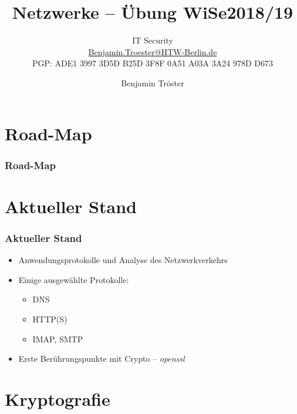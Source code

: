 \documentclass[xcolor=dvipsnames, aspectratio=169]{beamer}
\begin{document}

\title{Netzwerke -- Übung WiSe2018/19}
\subtitle{IT Security\\
		\href{mailto:Benjamin.Troester@HTW-Berlin.de}{Benjamin.Troester@HTW-Berlin.de}\\
		PGP: ADE1 3997 3D5D B25D 3F8F 0A51 A03A 3A24 978D D673 }
\author{Benjamin Tröster}

\date{}

\begin{frame}
\titlepage

\end{frame}

\section*{Road-Map}
\begin{frame}
\frametitle{Road-Map}
\begin{multicols}{2}
  \tableofcontents
\end{multicols}
\end{frame}

\section{Aktueller Stand}
\begin{frame}
	\frametitle{Aktueller Stand}
	\begin{itemize}
		\item Anwendungsprotokolle und Analyse des Netzwerkverkehrs
		\item Einige ausgewählte Protokolle:
		\begin{itemize}
			\item DNS
			\item HTTP(S)
			\item IMAP, SMTP
		\end{itemize}
		\item Erste Berührungspunkte mit Crypto -- \emph{openssl}
	\end{itemize}
\end{frame}

\section{Kryptografie}
\end{document}
